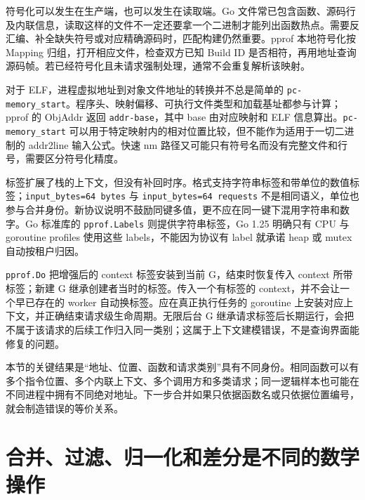 \documentclass[UTF8,fontset=fandol,openany,11pt]{ctexbook}
\begin{document}
符号化可以发生在生产端，也可以发生在读取端。Go 文件常已包含函数、源码行及内联信息，读取这样的文件不一定还要拿一个二进制才能列出函数热点。需要反汇编、补全缺失符号或对应精确源码时，匹配构建仍然重要。pprof 本地符号化按 Mapping 归组，打开相应文件，检查双方已知 Build ID 是否相符，再用地址查询源码帧。若已经符号化且未请求强制处理，通常不会重复解析该映射。\cite{pp-symbolizer}


对于 ELF，进程虚拟地址到对象文件地址的转换并不总是简单的 \texttt{pc-\allowbreak{}memory\_\allowbreak{}start}。程序头、映射偏移、可执行文件类型和加载基址都参与计算；pprof 的 ObjAddr 返回 \texttt{addr-\allowbreak{}base}，其中 base 由对应映射和 ELF 信息算出。\texttt{pc-\allowbreak{}memory\_\allowbreak{}start} 可以用于特定映射内的相对位置比较，但不能作为适用于一切二进制的 addr2line 输入公式。快速 nm 路径又可能只有符号名而没有完整文件和行号，需要区分符号化精度。\cite{pp-binutils}


标签扩展了栈的上下文，但没有补回时序。格式支持字符串标签和带单位的数值标签；\texttt{input\_\allowbreak{}bytes=64 bytes} 与 \texttt{input\_\allowbreak{}bytes=64 requests} 不是相同语义，单位也参与合并身份。新协议说明不鼓励同键多值，更不应在同一键下混用字符串和数字。Go 标准库的 \texttt{pprof.\allowbreak{}Labels} 则提供字符串标签，Go 1.25 明确只有 CPU 与 goroutine profiles 使用这些 labels，不能因为协议有 label 就承诺 heap 或 mutex 自动按租户归因。\cite{pp-proto}\cite{pp-merge}\cite{pp-label-support}


\texttt{pprof.\allowbreak{}Do} 把增强后的 context 标签安装到当前 G，结束时恢复传入 context 所带标签；新建 G 继承创建者当时的标签。传入一个有标签的 context，并不会让一个早已存在的 worker 自动换标签。应在真正执行任务的 goroutine 上安装对应上下文，并正确结束请求级生命周期。无限后台 G 继承请求标签后长期运行，会把不属于该请求的后续工作归入同一类别；这属于上下文建模错误，不是查询界面能修复的问题。\cite{pp-labels}


本节的关键结果是“地址、位置、函数和请求类别”具有不同身份。相同函数可以有多个指令位置、多个内联上下文、多个调用方和多类请求；同一逻辑样本也可能在不同进程中拥有不同绝对地址。下一步合并如果只依据函数名或只依据位置编号，就会制造错误的等价关系。\cite{pp-proto}\cite{pp-merge}


\section{合并、过滤、归一化和差分是不同的数学操作}
\end{document}
